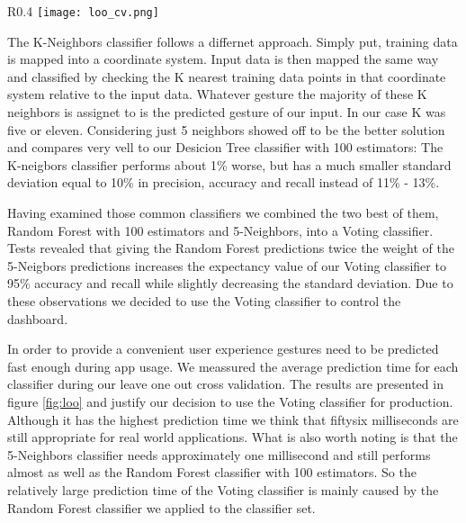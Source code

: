 \begin{wrapfigure}{R}{0.4\textwidth}
\centering
\texttt{[image: loo\_cv.png]}
\caption{Leave one out cross validation accuracy}\label{fig:loo}
\end{wrapfigure}

The K-Neighbors classifier follows a differnet approach. Simply put, training data is mapped into a coordinate system. Input data is then mapped the same way and classified by checking the K nearest training data points in that coordinate system relative to the input data. Whatever gesture the majority of these K neighbors is assignet to is the predicted gesture of our input. In our case K was five or eleven. Considering just 5 neighbors showed off to be the better solution and compares very vell to our Desicion Tree classifier with 100 estimators: The K-neigbors classifier performs about 1\% worse, but has a much smaller standard deviation equal to 10\% in precision, accuracy and recall instead of 11\% - 13\%.

Having examined those common classifiers we combined the two best of them, Random Forest with 100 estimators and 5-Neighbors, into a Voting classifier. Tests revealed that giving the Random Forest predictions twice the weight of the 5-Neigbors predictions increases the expectancy value of our Voting classifier to 95\% accuracy and recall while slightly decreasing the standard deviation. Due to these observations we decided to use the Voting classifier to control the dashboard.

In order to provide a convenient user experience gestures need to be predicted fast enough during app usage. We meassured the average prediction time for each classifier during our leave one out cross validation. The results are presented in figure \ref{fig:loo} and justify our decision to use the Voting classifier for production. Although it has the highest prediction time we think that fiftysix milliseconds are still appropriate for real world applications. What is also worth noting is that the 5-Neighbors classifier needs approximately one millisecond and still performs almost as well as the Random Forest classifier with 100 estimators. So the relatively large prediction time of the Voting classifier is mainly caused by the Random Forest classifier we applied to the classifier set.

